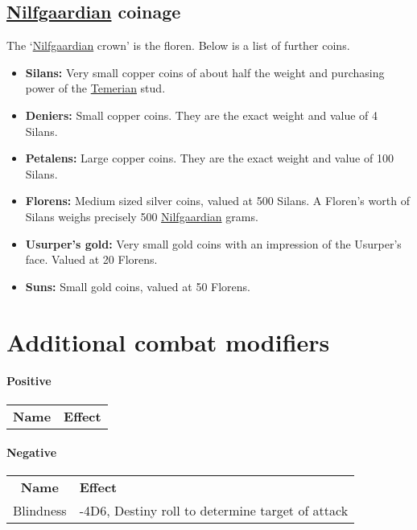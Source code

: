 \documentclass[parskip=full,11pt,%
footheight=38pt]{scrreport}
\begin{document}
\section{\hyperref[realm:nilfgaard]{Nilfgaardian} coinage}
The `\hyperref[realm:nilfgaard]{Nilfgaardian} crown' is the floren. Below is a list of further coins.

\begin{itemize}
	\item \textbf{Silans:} Very small copper coins of about half the weight and purchasing power of the \hyperref[realm:temeria]{Temerian}
	      stud.
	\item \textbf{Deniers:} Small copper coins. They are the exact weight and value of 4 Silans.
	\item \textbf{Petalens:} Large copper coins. They are the exact weight and value of 100 Silans.
	\item \textbf{Florens:} Medium sized silver coins, valued at 500 Silans. A Floren's worth of Silans weighs
	      precisely 500 \hyperref[realm:nilfgaard]{Nilfgaardian} grams.
	\item \textbf{Usurper's gold:} Very small gold coins with an impression of the Usurper's face. Valued at 20 Florens.
	\item \textbf{Suns:} Small gold coins, valued at 50 Florens.
\end{itemize}

\chapter{Additional combat modifiers}

\large

\subsubsection*{Positive}

\begin{tabular}{cl}
	\rowcolor{tablebackgroundposhead}
	\textbf{Name} & \textbf{Effect} \\
\end{tabular}


\subsubsection*{Negative}

\begin{tabular}{cl}
	\rowcolor{tablebackgroundneghead}
	\textbf{Name}                       & \textbf{Effect}                                  \\
	Blindness\label{modifier:blindness} & -4D6, Destiny roll to determine target of attack \\
\end{tabular}
\end{document}
